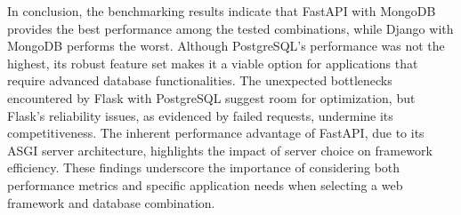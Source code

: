 \documentclass[12pt,onecolumn,a4paper,titlepage]{article}
\begin{document}
In conclusion, the benchmarking results indicate that FastAPI with MongoDB provides the best performance among the tested combinations, while Django with MongoDB performs the worst. Although PostgreSQL's performance was not the highest, its robust feature set makes it a viable option for applications that require advanced database functionalities. The unexpected bottlenecks encountered by Flask with PostgreSQL suggest room for optimization, but Flask's reliability issues, as evidenced by failed requests, undermine its competitiveness. The inherent performance advantage of FastAPI, due to its ASGI server architecture, highlights the impact of server choice on framework efficiency. These findings underscore the importance of considering both performance metrics and specific application needs when selecting a web framework and database combination.
\end{document}
